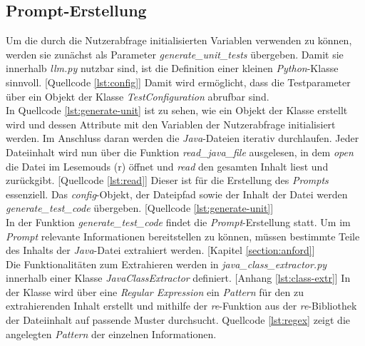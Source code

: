 \subsection{Prompt-Erstellung}
Um die durch die Nutzerabfrage initialisierten Variablen verwenden zu können, werden sie zunächst als Parameter \textit{generate\_unit\_tests} übergeben. Damit sie innerhalb \textit{llm.py} nutzbar sind, ist die Definition einer kleinen \textit{Python}-Klasse sinnvoll. [Quellcode \ref{lst:config}] Damit wird ermöglicht, dass die Testparameter über ein Objekt der Klasse \textit{TestConfiguration} abrufbar sind.\\
\vspace{-.3cm}
In Quellcode \ref{lst:generate-unit} ist zu sehen, wie ein Objekt der Klasse erstellt wird und dessen Attribute mit den Variablen der Nutzerabfrage initialisiert werden. Im Anschluss daran werden die \textit{Java}-Dateien iterativ durchlaufen. Jeder Dateiinhalt wird nun über die Funktion \textit{read\_java\_file} ausgelesen, in dem \textit{open} die Datei im Lesemouds (r) öffnet und \textit{read} den gesamten Inhalt liest und zurückgibt. [Quellcode \ref{lst:read}] Dieser ist für die Erstellung des \textit{Prompts} essenziell. Das \textit{config}-Objekt, der Dateipfad sowie der Inhalt der Datei werden \textit{generate\_test\_code} übergeben. [Quellcode \ref{lst:generate-unit}]\\
\vspace{0.5cm}
\vspace{-.3cm}
In der Funktion \textit{generate\_test\_code} findet die \textit{Prompt}-Erstellung statt. Um im \textit{Prompt} relevante Informationen bereitstellen zu können, müssen bestimmte Teile des Inhalts der \textit{Java}-Datei extrahiert werden. [Kapitel \ref{section:anford}]\\ Die Funktionalitäten zum Extrahieren werden in \textit{java\_class\_extractor.py} innerhalb einer Klasse \textit{JavaClassExtractor} definiert. [Anhang \ref{lst:class-extr}] In der Klasse wird über eine \textit{Regular Expression} ein \textit{Pattern} für den zu extrahierenden Inhalt erstellt und mithilfe der \textit{re}-Funktion aus der \textit{re}-Bibliothek der Dateiinhalt auf passende Muster durchsucht. Quellcode \ref{lst:regex} zeigt die angelegten \textit{Pattern} der einzelnen Informationen.\\
